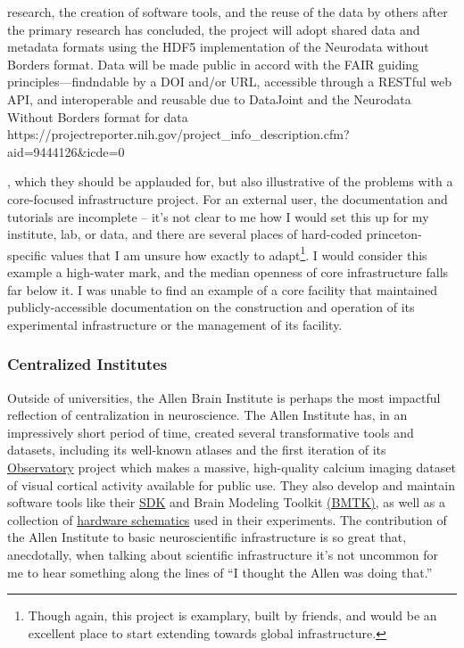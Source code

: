 \documentclass[11pt]{article}
\begin{document}
\begin{multicols}{2}
{\begin{leftbar}
  research, the creation of software tools, and the reuse of the data by
  others after the primary research has concluded, the project will
  adopt shared data and metadata formats using the HDF5 implementation
  of the Neurodata without Borders format. Data will be made public in
  accord with the FAIR guiding principles---findndable by a DOI and/or
  URL, accessible through a RESTful web API, and interoperable and
  reusable due to DataJoint and the Neurodata Without Borders format for
  data
  https://projectreporter.nih.gov/project\_info\_description.cfm?aid=9444126\&icde=0
  \end{leftbar}}, which they should be applauded for, but also
illustrative of the problems with a core-focused infrastructure project.
For an external user, the documentation and tutorials are incomplete --
it's not clear to me how I would set this up for my institute, lab, or
data, and there are several places of hard-coded princeton-specific
values that I am unsure how exactly to adapt\footnote{Though again, this
  project is examplary, built by friends, and would be an excellent
  place to start extending towards global infrastructure.}. I would
consider this example a high-water mark, and the median openness of core
infrastructure falls far below it. I was unable to find an example of a
core facility that maintained publicly-accessible documentation on the
construction and operation of its experimental infrastructure or the
management of its facility.

\hypertarget{centralized-institutes}{%
\subsubsection{Centralized Institutes}\label{centralized-institutes}}

Outside of universities, the Allen Brain Institute is perhaps the most
impactful reflection of centralization in neuroscience. The Allen
Institute has, in an impressively short period of time, created several
transformative tools and datasets, including its well-known atlases \cite{leinGenomewideAtlasGene2007}  and the first iteration of its
\href{http://observatory.brain-map.org/}{Observatory} project which
makes a massive, high-quality calcium imaging dataset of visual cortical
activity available for public use. They also develop and maintain
software tools like their
\href{https://allensdk.readthedocs.io/en/latest/}{SDK} and Brain
Modeling Toolkit \href{https://alleninstitute.github.io/bmtk/}{(BMTK)},
as well as a collection of
\href{https://portal.brain-map.org/explore/toolkit/hardware}{hardware
schematics} used in their experiments. The contribution of the Allen
Institute to basic neuroscientific infrastructure is so great that,
anecdotally, when talking about scientific infrastructure it's not
uncommon for me to hear something along the lines of ``I thought the
Allen was doing that.''


\end{multicols}
\end{document}
